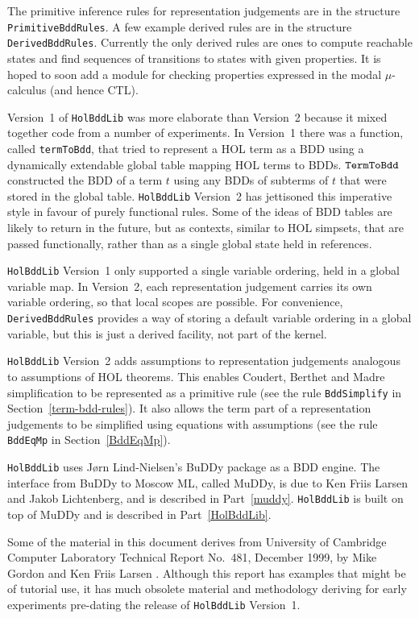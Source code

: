 \documentclass[12pt]{article}
\renewcommand{\t}[1]{\mbox{\tt #1}}
\newcommand\HOL{HOL\xspace}
\newcommand{\Buddy}{BuDDy\xspace}
\newcommand{\Muddy}{MuDDy\xspace}
\begin{document}
The primitive inference rules for representation judgements are in the structure
{\tt{PrimitiveBddRules}}. A few example derived rules are in the
structure {\tt{DerivedBddRules}}. Currently the only derived rules are
ones to compute reachable states and find sequences of transitions to
states with given properties.  It is hoped to soon add a module for
checking properties expressed in the modal $\mu$-calculus (and hence CTL).


Version~1 of {\tt{HolBddLib}} was more elaborate than Version~2
because it mixed together code from a number of experiments.
In Version~1 there was a function, called
{\texttt{termToBdd}}, that tried to represent a \HOL{} term as a BDD
using a dynamically extendable global table mapping \HOL{} terms to
BDDs.  $\t{TermToBdd}$ constructed the BDD of a term $t$ using any
BDDs of subterms of $t$ that were stored in the global table.
{\tt{HolBddLib}} Version~2 has jettisoned this imperative style
in favour of purely functional rules. Some of
the ideas of BDD tables are likely to return in the future, but as
contexts, similar to HOL simpsets, that are passed functionally,
rather than as a single global state held in references.

{\tt{HolBddLib}} Version~1 only supported a single variable
ordering, held in a global variable map. In Version~2, each
representation judgement carries its own variable ordering, so that local
scopes are possible. For convenience, {\tt{DerivedBddRules}}
provides a way of storing a default variable ordering in a global
variable, but this is just a derived facility, not part of the kernel.

{\tt{HolBddLib}} Version~2 adds assumptions to representation judgements
analogous to assumptions of HOL theorems. This enables
Coudert, Berthet and Madre simplification to be represented as a primitive
rule (see the rule \t{BddSimplify} in 
Section~\ref{term-bdd-rules}). 
It also allows the term part
of a representation judgements to be simplified using equations with assumptions
(see the rule \t{BddEqMp} in Section~\ref{BddEqMp}).

{\tt HolBddLib} uses J{\o}rn Lind-Nielsen's \Buddy{} package as a BDD
engine. The interface from \Buddy{} to Moscow ML, called \Muddy, is
due to Ken Friis Larsen and Jakob Lichtenberg, and is described in Part~\ref{muddy}.
{\tt HolBddLib} is built on top of \Muddy{} and
is described in Part~\ref{HolBddLib}.

Some of the material in this document derives from University of
Cambridge Computer Laboratory Technical Report No.~481, December 1999,
by Mike Gordon and Ken Friis Larsen \cite{GordonLarsen}. Although this
report has examples that might be of tutorial use, it has much
obsolete material and methodology deriving for early experiments
pre-dating the release of {\tt HolBddLib} Version~1.
\end{document}
